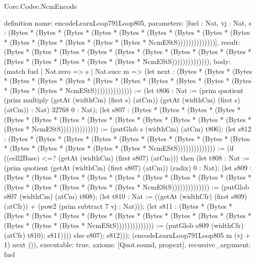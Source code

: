 \begin{lexlean}{Uorc.Codec.NcmEncode}
\begin{semanticmodule}
definition{
  name: encodeLearnLoop791Loop805,
  parameters: [fuel : Nat, vj : Nat, s : (Bytes * (Bytes * (Bytes * (Bytes * (Bytes * (Bytes * (Bytes * (Bytes * (Bytes * (Bytes * (Bytes * (Bytes * (Bytes * (Bytes * NcmEStS))))))))))))))],
  result: (Bytes * (Bytes * (Bytes * (Bytes * (Bytes * (Bytes * (Bytes * (Bytes * (Bytes * (Bytes * (Bytes * (Bytes * (Bytes * (Bytes * NcmEStS)))))))))))))),
  body: (match fuel
    | Nat.zero => s
    | Nat.succ m => (let next : (Bytes * (Bytes * (Bytes * (Bytes * (Bytes * (Bytes * (Bytes * (Bytes * (Bytes * (Bytes * (Bytes * (Bytes * (Bytes * (Bytes * NcmEStS)))))))))))))) := (let t806 : Nat := (prim quotient (prim multiply (getAt (widthCm) (first s) (atCm)) (getAt (widthCm) (first s) (atCm)) : Nat) 32768 0 : Nat); (let s807 : (Bytes * (Bytes * (Bytes * (Bytes * (Bytes * (Bytes * (Bytes * (Bytes * (Bytes * (Bytes * (Bytes * (Bytes * (Bytes * (Bytes * NcmEStS)))))))))))))) := (putGlob s (widthCm) (atCm) t806); (let s812 : (Bytes * (Bytes * (Bytes * (Bytes * (Bytes * (Bytes * (Bytes * (Bytes * (Bytes * (Bytes * (Bytes * (Bytes * (Bytes * (Bytes * NcmEStS)))))))))))))) := (if ((cell2Base) <=? (getAt (widthCm) (first s807) (atCm))) then (let t808 : Nat := (prim quotient (getAt (widthCm) (first s807) (atCm)) (radix) 0 : Nat); (let s809 : (Bytes * (Bytes * (Bytes * (Bytes * (Bytes * (Bytes * (Bytes * (Bytes * (Bytes * (Bytes * (Bytes * (Bytes * (Bytes * (Bytes * NcmEStS)))))))))))))) := (putGlob s807 (widthCm) (atCm) t808); (let t810 : Nat := ((getAt (widthCfr) (first s809) (atCfr)) + (pow2 (prim subtract 7 vj : Nat))); (let s811 : (Bytes * (Bytes * (Bytes * (Bytes * (Bytes * (Bytes * (Bytes * (Bytes * (Bytes * (Bytes * (Bytes * (Bytes * (Bytes * (Bytes * NcmEStS)))))))))))))) := (putGlob s809 (widthCfr) (atCfr) t810); s811)))) else s807); s812))); (encodeLearnLoop791Loop805 m (vj + 1) next ))),
  executable: true,
  axioms: [Quot.sound, propext],
  recursive_argument: fuel
}


\end{semanticmodule}
\end{lexlean}
